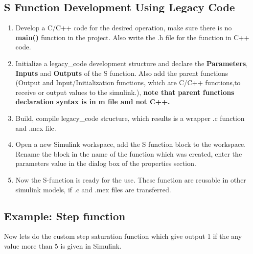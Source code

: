 \documentclass{article}
\begin{document}
\subsection{S Function Development Using Legacy Code}
\begin{enumerate}
    \item Develop a C/C++ code for the desired operation, make sure there is no \textbf{main()} function in the project. Also write the .h file for the function in C++ code.
    \item Initialize a legacy\_code development structure and declare the \textbf{Parameters}, \textbf{Inputs} and \textbf{Outputs} of the S function. Also add the parent functions (Output and Input/Initialization functions, which are C/C++ functions,to receive or output values to the simulink.), \textbf{note that parent functions declaration syntax is in m file and not C++.} 
    \item Build, compile legacy\_code structure, which results is a wrapper .c function and .mex file.
    \item Open a new Simulink workspace, add the S function block to the workspace. Rename the block in the name of the function which was created, enter the parameters value in the dialog box of the properties section.
    \item Now the S-function is ready for the use. These function are reusable in other simulink models, if .c and .mex files are transferred.
\end{enumerate}

\subsection{Example: Step function}
Now lets do the custom step saturation function which give output 1 if the any value more than 5 is given in Simulink.
\end{document}
